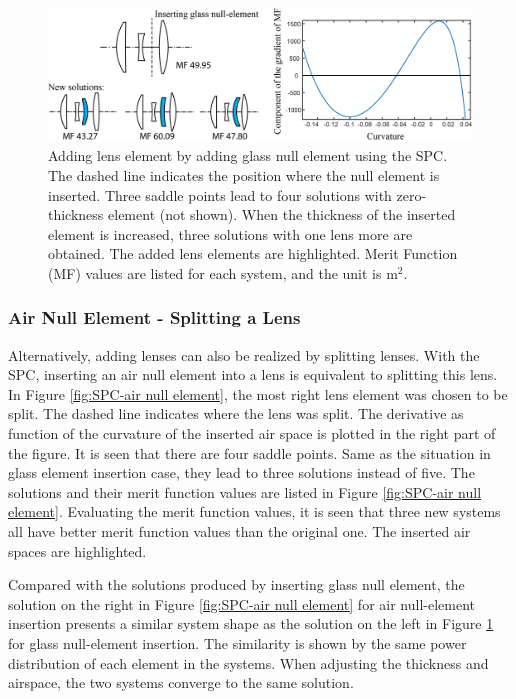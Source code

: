 \begin{figure}[h!]
    \centering
    \includegraphics[scale=0.68]{chapter-2/figures/spc_add_glass.png}
    \caption{Adding lens element by adding glass null element using the SPC. The dashed line indicates the position where the null element is inserted. Three saddle points lead to four solutions with zero-thickness element (not shown). When the thickness of the inserted element is increased, three solutions with one lens more are obtained. The added lens elements are highlighted. Merit Function (MF) values are listed for each system, and the unit is \textmu m$^2$. }
    \label{fig:SPC-glass null element}
\end{figure}

\subsubsection{Air Null Element - Splitting a Lens}

Alternatively, adding lenses can also be realized by splitting lenses. With the SPC, inserting an air null element into a lens is equivalent to splitting this lens. In Figure \ref{fig:SPC-air null element}, the most right lens element was chosen to be split. The dashed line indicates where the lens was split. The derivative as function of the curvature of the inserted air space is plotted in the right part of the figure. It is seen that there are four saddle points. Same as the situation in glass element insertion case, they lead to three solutions instead of five. The solutions and their merit function values are listed in Figure \ref{fig:SPC-air null element}. Evaluating the merit function values, it is seen that three new systems all have better merit function values than the original one. The inserted air spaces are highlighted.

Compared with the solutions produced by inserting glass null element, the solution on the right in Figure \ref{fig:SPC-air null element} for air null-element insertion presents a similar system shape as the solution on the left in Figure \ref{fig:SPC-glass null element} for glass null-element insertion. The similarity is shown by the same power distribution of each element in the systems. When adjusting the thickness and airspace, the two systems converge to the same solution. 


